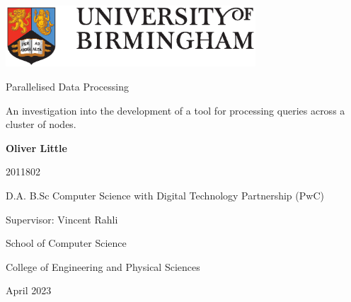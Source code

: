 \begin{titlepage}
	\begin{center}
		\vspace*{1cm}
		
		\includegraphics[width=0.7\textwidth]{uob-logo.eps}
		
		\vspace{1.5cm}
		
		\huge
		Parallelised Data Processing
		
		\vspace{0.5cm}
		
		\large
		An investigation into the development of a tool for processing queries across a cluster of nodes.
		
		\vspace{1.5cm}
		
		\textbf{Oliver Little}
		
		\vspace{0.25cm}
		
		\small 2011802
		
		\vspace{0.25cm}
		
		\large
		D.A. B.Sc Computer Science with Digital Technology Partnership (PwC)
		
		\vspace{2cm}
		
		Supervisor: Vincent Rahli
		
		\vspace{2cm}
		
		\large
		School of Computer Science
		
		\large
		College of Engineering and Physical Sciences
		
		\large
		April 2023
	\end{center}
\end{titlepage}